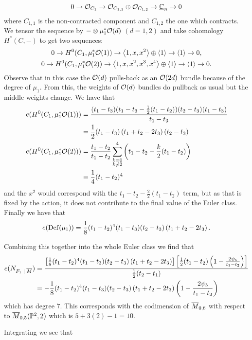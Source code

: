 \documentclass[12pt]{memoir}
\begin{document}
\begin{Ex}
\begin{itemize}
        $$0\to\mathcal{O}_{C_1}\to\mathcal{O}_{C_{1,1}}\oplus\mathcal{O}_{C_{1,2}}\to\underline{\mathbb{C}}_{n}\to0$$
        where $C_{1,1}$ is the non-contracted component and $C_{1,2}$ the one which contracts. We tensor the sequence by $-\otimes \mu_1^\ast\mathcal{O}(d)$ $(d=1,2)$ and take cohomology $H^\ast(C,-)$ to get two sequences:
        \begin{gather*}
            0\to H^0(C_1,\mu_1^\ast\mathcal{O}(1))\to\left\langle 1,x,x^2\right\rangle\oplus\left\langle 1\right\rangle\to\left\langle 1\right\rangle\to 0,\\
            0\to H^0(C_1,\mu_1^\ast\mathcal{O}(2))\to\left\langle 1,x,x^2,x^3,x^4\right\rangle\oplus\left\langle 1\right\rangle\to\left\langle 1\right\rangle\to 0.
        \end{gather*}
        Observe that in this case the $\mathcal{O}(d)$ pulls-back as an $\mathcal{O}(2d)$ bundle because of the degree of $\mu_1$. From this, the weights of $\mathcal{O}(d)$ bundles do pullback as usual but the middle weights change. We have that 
        \begin{align*}
        e(H^0(C_1,\mu_1^\ast\cO(1)))&=\frac{(t_1-t_3)(t_1-t_3-\half(t_1-t_2))(t_2-t_3)(t_1-t_3)}{t_1-t_3}\\
        &=\half(t_1-t_3)\left(t_1+t_2-2t_3\right)(t_2-t_3)\\
        e(H^0(C_1,\mu_1^\ast\cO(2)))&=\frac{t_1-t_2}{t_1-t_2}\sum_{\substack{k=0\\ k\neq 2}}^{4}\left(t_1-t_2-\frac{k}{2}(t_1-t_2)\right)\\
        &=\frac{1}{4}(t_1-t_2)^4
        \end{align*}
        and the $x^2$ would correspond with the $t_1-t_2-\frac{2}{2}(t_1-t_2)$ term, but as that is fixed by the action, it does not contribute to the final value of the Euler class.
        Finally we have that 
        $$e(\operatorname{Def}(\mu_1))=\frac{1}{8}(t_1-t_2)^4(t_1-t_3)(t_2-t_3)\left(t_1+t_2-2t_3\right).$$
    \end{itemize}
    Combining this together into the whole Euler class we find that 
    \begin{align*}
    e(N_{F_1\mid\ov M})&=\frac{\bonj{\frac{1}{8}(t_1-t_2)^4(t_1-t_3)(t_2-t_3)\left(t_1+t_2-2t_3\right)}\bonj{\half(t_1-t_2)\left(1-\frac{2\psi_b}{t_1-t_2}\right)}}{\half(t_2-t_1)}\\
    &=-\frac{1}{8}(t_1-t_2)^4(t_1-t_3)(t_2-t_3)\left(t_1+t_2-2t_3\right)\left(1-\frac{2\psi_b}{t_1-t_2}\right)
    \end{align*}
    which has degree $7$. This corresponds with the codimension of $\overline{M}_{0,6}$ with respect to $\overline M_{0,5}(\mathbb{P}^2,2)$ which is $5+3(2)-1=10$.\par
    Integrating we see that
    \begin{align*}

\end{align*}
\end{Ex}
\end{document}
